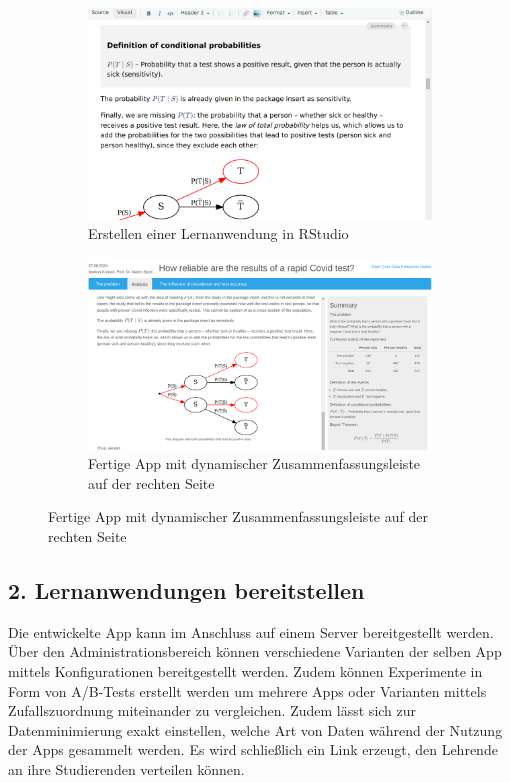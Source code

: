 \documentclass[a0,portrait]{a0poster}
\begin{document}
\begin{multicols}{2}
\vspace{1cm}

\begin{figure}[H]
\hfill
\begin{subfigure}[h]{0.45\linewidth}
\includegraphics[width=\linewidth]{at-visual-smaller}
\caption{Erstellen einer Lernanwendung in RStudio}
\end{subfigure}
\hfill
\begin{subfigure}[h]{0.45\linewidth}
\includegraphics[width=\linewidth]{app-summary}
\caption{Fertige App mit dynamischer Zusammenfassungsleiste auf der rechten Seite}
\end{subfigure}
\hfill
\end{figure}

\subsection*{2. Lernanwendungen bereitstellen}

Die entwickelte App kann im Anschluss auf einem Server bereitgestellt werden. Über den Administrationsbereich können verschiedene Varianten der selben App mittels Konfigurationen bereitgestellt werden. Zudem können Experimente in Form von A/B-Tests erstellt werden um mehrere Apps oder Varianten mittels Zufallszuordnung miteinander zu vergleichen. Zudem lässt sich zur Datenminimierung exakt einstellen, welche Art von Daten während der Nutzung der Apps gesammelt werden. Es wird schließlich ein Link erzeugt, den Lehrende an ihre Studierenden verteilen können.


\end{multicols}
\end{document}
